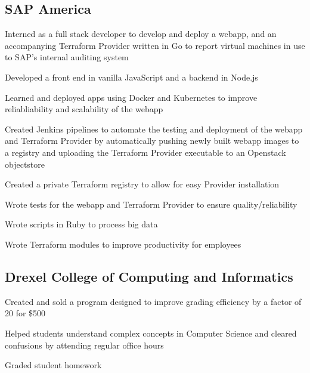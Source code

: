 \documentclass[]{deedy-resume-openfont}
\begin{document}
\begin{minipage}[t]{0.66\textwidth}
    \subsection{SAP America}
    \begin{tightemize}
        \item Interned as a full stack developer to develop and deploy a webapp, and an accompanying Terraform Provider written in Go to report virtual machines in use to SAP's internal auditing system
        \item Developed a front end in vanilla JavaScript and a backend in Node.js
        \item Learned and deployed apps using Docker and Kubernetes to improve reliabliability and scalability of the webapp
        \item Created Jenkins pipelines to automate the testing and deployment of the webapp and Terraform Provider by automatically pushing newly built webapp images to a registry and uploading the Terraform Provider executable to an Openstack objectstore
        \item Created a private Terraform registry to allow for easy Provider installation
        \item Wrote tests for the webapp and Terraform Provider to ensure quality/reliability
        \item Wrote scripts in Ruby to process big data
        \item Wrote Terraform modules to improve productivity for employees \\
    \end{tightemize}
    \sectionsep
    
    
    \subsection{Drexel College of Computing and Informatics}
    \begin{tightemize}
        \item Created and sold a program designed to improve grading efficiency by a factor of 20 for \$500
        \item Helped students understand complex concepts in Computer Science and cleared confusions by attending regular office hours
        \item Graded student homework
    \end{tightemize}
    \sectionsep


\end{minipage}
\end{document}
